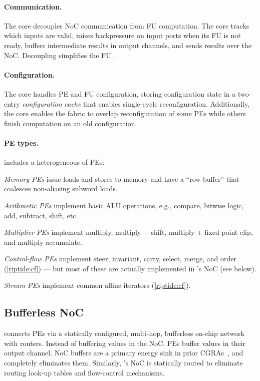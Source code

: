 \paragraph{Communication.}
The \textmu core decouples NoC communication from FU computation.
% 
The \textmu core tracks which inputs are valid, raises backpressure on
input ports when its FU is not ready, buffers intermediate results in
output channels, and sends results over the NoC.
%
Decoupling simplifies the FU.

\paragraph{Configuration.}
The \textmu core handles PE and FU configuration, storing configuration state in a
two-entry {\em configuration cache} that enables single-cycle reconfiguration. 
% 
Additionally, the \textmu core enables the fabric to overlap
reconfiguration of some PEs while others
finish computation on an old configuration.

\paragraph{PE types.}
\riptide includes a heterogeneous of PEs:
\begin{compactitem}
\item \emph{Memory PEs} issue loads and stores to memory and have a ``row buffer'' that coalesces non-aliasing subword loads.

\item \emph{Arithmetic PEs} implement basic ALU operations, e.g., compare, bitwise logic, add, subtract, shift, etc.

\item \emph{Multiplier PEs} implement multiply, multiply + shift, multiply + fixed-point clip, and multiply-accumulate.

\item \emph{Control-flow PEs} implement steer, invariant, carry, select, merge, and order (\autoref{riptide:cf}) ---
%
but most of these are actually implemented in \riptide's NoC (see below).

\item \emph{Stream PEs} implement common affine iterators (\autoref{riptide:cf}).
\end{compactitem}

\subsection{Bufferless NoC}

\riptide connects PEs via a statically configured, multi-hop, bufferless
on-chip network with routers.
%
Instead of buffering values in the NoC,
PEs buffer values in their output channel.
%
NoC buffers are a primary energy sink in prior CGRAs~\cite{karunaratne2017hycube,snafu},
and \riptide completely eliminates them.
%
Similarly, \riptide's NoC is statically routed to eliminate routing
look-up tables and flow-control mechanisms.
% 